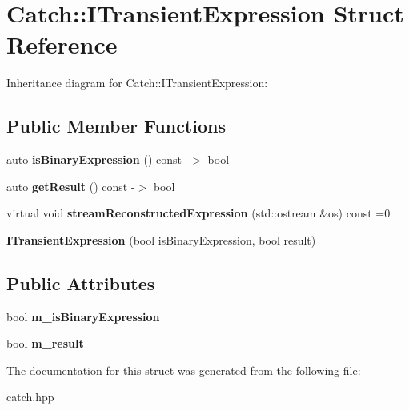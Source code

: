 \hypertarget{structCatch_1_1ITransientExpression}{}\section{Catch\+:\+:I\+Transient\+Expression Struct Reference}
\label{structCatch_1_1ITransientExpression}


Inheritance diagram for Catch\+:\+:I\+Transient\+Expression\+:
\subsection*{Public Member Functions}
\begin{DoxyCompactItemize}
\item 
auto {\bfseries is\+Binary\+Expression} () const -\/$>$ bool\hypertarget{structCatch_1_1ITransientExpression_a3b436e13a0a6d3522bbf70d4e31deb22}{}\label{structCatch_1_1ITransientExpression_a3b436e13a0a6d3522bbf70d4e31deb22}

\item 
auto {\bfseries get\+Result} () const -\/$>$ bool\hypertarget{structCatch_1_1ITransientExpression_a101c7db86c87eff93a8ff496720e6320}{}\label{structCatch_1_1ITransientExpression_a101c7db86c87eff93a8ff496720e6320}

\item 
virtual void {\bfseries stream\+Reconstructed\+Expression} (std\+::ostream \&os) const =0\hypertarget{structCatch_1_1ITransientExpression_aabe1889df9c6e639a24afb08d8a0fe9e}{}\label{structCatch_1_1ITransientExpression_aabe1889df9c6e639a24afb08d8a0fe9e}

\item 
{\bfseries I\+Transient\+Expression} (bool is\+Binary\+Expression, bool result)\hypertarget{structCatch_1_1ITransientExpression_aafe69572b7ed884e63ec81f58d4afd8c}{}\label{structCatch_1_1ITransientExpression_aafe69572b7ed884e63ec81f58d4afd8c}

\end{DoxyCompactItemize}
\subsection*{Public Attributes}
\begin{DoxyCompactItemize}
\item 
bool {\bfseries m\+\_\+is\+Binary\+Expression}\hypertarget{structCatch_1_1ITransientExpression_a75ce48da824d514d08152d396abb28d8}{}\label{structCatch_1_1ITransientExpression_a75ce48da824d514d08152d396abb28d8}

\item 
bool {\bfseries m\+\_\+result}\hypertarget{structCatch_1_1ITransientExpression_a4646e2b5e0156e913653ec3b9b60c942}{}\label{structCatch_1_1ITransientExpression_a4646e2b5e0156e913653ec3b9b60c942}

\end{DoxyCompactItemize}


The documentation for this struct was generated from the following file\+:\begin{DoxyCompactItemize}
\item 
catch.\+hpp\end{DoxyCompactItemize}
